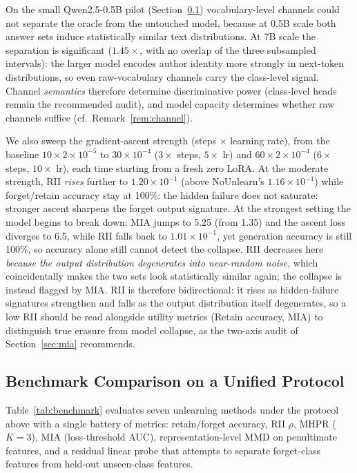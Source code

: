 \documentclass[smallextended]{svjour3}       %
\begin{document}
On the small Qwen2.5-0.5B pilot (Section~\ref{sec:benchmark}) vocabulary-level channels could not separate the oracle from the untouched model, because at 0.5B scale both answer sets induce statistically similar text distributions. At 7B scale the separation is significant ($1.45\times$, with no overlap of the three subsampled intervals): the larger model encodes author identity more strongly in next-token distributions, so even raw-vocabulary channels carry the class-level signal. Channel \emph{semantics} therefore determine discriminative power (class-level heads remain the recommended audit), and model capacity determines whether raw channels suffice (cf.\ Remark~\ref{rem:channel}).

We also sweep the gradient-ascent strength (steps $\times$ learning rate), from the baseline $10\times 2{\times}10^{-5}$ to $30\times 10^{-4}$ ($3\times$ steps, $5\times$ lr) and $60\times 2{\times}10^{-4}$ ($6\times$ steps, $10\times$ lr), each time starting from a fresh zero LoRA. At the moderate strength, RII \emph{rises} further to $1.20{\times}10^{-1}$ (above NoUnlearn's $1.16{\times}10^{-1}$) while forget/retain accuracy stay at 100\%: the hidden failure does not saturate: stronger ascent sharpens the forget output signature. At the strongest setting the model begins to break down: MIA jumps to 5.25 (from 1.35) and the ascent loss diverges to 6.5, while RII falls back to $1.01{\times}10^{-1}$, yet generation accuracy is still 100\%, so accuracy alone still cannot detect the collapse. RII decreases here \emph{because the output distribution degenerates into near-random noise}, which coincidentally makes the two sets look statistically similar again; the collapse is instead flagged by MIA. RII is therefore bidirectional: it rises as hidden-failure signatures strengthen and falls as the output distribution itself degenerates, so a low RII should be read alongside utility metrics (Retain accuracy, MIA) to distinguish true erasure from model collapse, as the two-axis audit of Section~\ref{sec:mia} recommends.

\subsection{Benchmark Comparison on a Unified Protocol}
\label{sec:benchmark}

Table~\ref{tab:benchmark} evaluates seven unlearning methods under the protocol above with a single battery of metrics: retain/forget accuracy, RII $\rho$, MHPR ($K{=}3$), MIA (loss-threshold AUC), representation-level MMD on penultimate features, and a residual linear probe that attempts to separate forget-class features from held-out unseen-class features.
\end{document}
